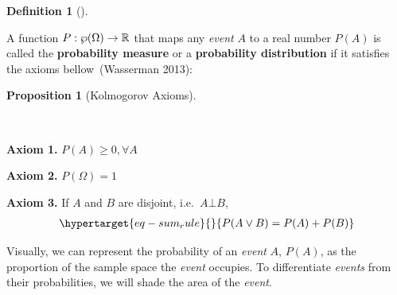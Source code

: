 \documentclass[
  letterpaper,
  12pt,
  british]{tufte-book}
\theoremstyle{plain}
\newtheorem{proposition}{Proposition}[chapter]
\theoremstyle{definition}
\newtheorem{definition}{Definition}[chapter]
\theoremstyle{plain}
\theoremstyle{remark}
\begin{document}
\leavevmode{}%
\begin{definition}[]\label{def-probability_distribution}

A function \(P: \Large\wp(\Omega) \to \mathbb{R}\) that maps any
\emph{event} \(A\) to a real number \(P(A)\) is called the
\textbf{probability measure} or a \textbf{probability distribution} if
it satisfies the axioms bellow~(Wasserman
2013):

\end{definition}

\leavevmode{}%
\begin{proposition}[Kolmogorov Axioms]\label{prp-kolmogorov_axioms}

~

\end{proposition}

\textbf{Axiom 1.} \(P(A)\geq 0, \forall A\)

\textbf{Axiom 2.} \(P(\Omega)=1\)

\textbf{Axiom 3.} If \(A\) and \(B\) are disjoint,
i.e.~\(A \bot B\),\protect\hypertarget{axiom-disjoint}{}{}
\begin{equation}\protect\hypertarget{eq-sum_rule}{}{\begin{aligned}
    P(A \lor B)= P(A)+P(B)
\end{aligned}}\label{eq-sum_rule}\end{equation}

Visually, we can represent the probability of an \emph{event} \(A\),
\(P(A)\), as the proportion of the sample space the \emph{event}
occupies. To differentiate \emph{events} from their probabilities, we
will shade the area of the \emph{event}.

\begin{figure}

\begin{minipage}[t]{\linewidth}

{\centering 

}

\end{minipage}%

\end{figure}
\end{document}
